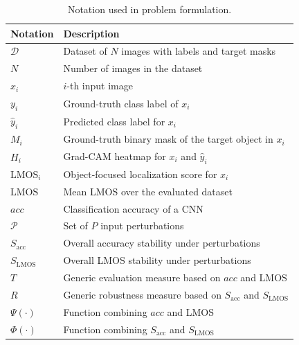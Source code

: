 \begin{table}[t]
	\centering
	\caption{Notation used in problem formulation.}
	\label{tab:notation}
	\begin{tabularx}{\linewidth}{l X}
		\toprule
		\textbf{Notation} & \textbf{Description} \\
		\midrule
		$\mathcal{D}$ & Dataset of $N$ images with labels and target masks \\
		$N$ & Number of images in the dataset \\
		$x_i$ & $i$-th input image \\
		$y_i$ & Ground-truth class label of $x_i$ \\
		$\hat{y}_i$ & Predicted class label for $x_i$ \\
		$M_i$ & Ground-truth binary mask of the target object in $x_i$ \\
		$H_i$ & Grad-CAM heatmap for $x_i$ and $\hat{y}_i$ \\
		$\mathrm{LMOS}_i$ & Object-focused localization score for $x_i$ \\
		$\mathrm{LMOS}$ & Mean LMOS over the evaluated dataset \\
		$acc$ & Classification accuracy of a CNN \\
		$\mathcal{P}$ & Set of $P$ input perturbations %
        \\
		$S_{\mathrm{acc}}$ & Overall accuracy stability under perturbations \\
		$S_{\mathrm{LMOS}}$ & Overall LMOS stability under perturbations \\
		$T$ & Generic evaluation measure based on $acc$ and $\mathrm{LMOS}$ \\
		$R$ & Generic robustness measure based on $S_{\mathrm{acc}}$ and $S_{\mathrm{LMOS}}$ \\
		$\Psi(\cdot)$ & Function combining $acc$  and LMOS \\
		$\Phi(\cdot)$ & Function combining $S_{\mathrm{acc}}$ and $S_{\mathrm{LMOS}}$\\
		\bottomrule
	\end{tabularx}
\end{table}